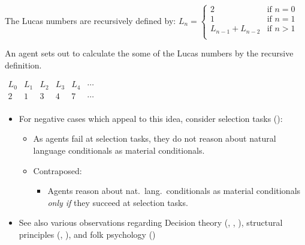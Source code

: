 \documentclass[10pt]{article}
\newcommand{\hand}{\ding{43}}
\begin{document}
\begin{note}
    \begin{scenario}%
    \label{scen:LucasNums}%
    The Lucas numbers are recursively defined by: \qquad
    \(
      L_{n} = \left\{
        \begin{array}{ll}
          2 & \text{if } n = 0 \\
          1 & \text{if } n = 1 \\
          L_{n-1} + L_{n-2} & \text{if } n > 1 \\
        \end{array}
      \right.
    \)

    \smallskip
    \noindent An agent sets out to calculate the some of the Lucas numbers by the recursive definition.
    \begin{center}
      \(
      \begin{array}{cccccc}
        L_{0} & L_{1} & L_{2} & L_{3} & L_{4} & \cdots \\
        \hline
        2 & 1 & 3 & 4 & 7 & \cdots \\
      \end{array}
      \)
    \end{center}
    \vspace{-2\baselineskip}
  \end{scenario}

\begin{comment}
  Note, the agent doesn't (necessarily) conclude \(L_{4}\) from \prop{0}-\val{0} pairs which detail \(L_{2}\) and \(L_{3}\).
  For, \(L_{2}\) and \(L_{3}\) both \fof{} the recursive definition.

  The agent's doesn't need anything other than the recursive definition to get \(L_{4}\), though they'll get \(L_{2}\) and \(L_{3}\) on the way to \(L_{4}\).
\end{comment}

  \begin{itemize}[noitemsep]
  \item[\hand]
    For negative cases which appeal to this idea, consider selection tasks (\cite{Wason:1966aa}):
    \begin{itemize}[noitemsep]
    \item[\leadsto]
      As agents fail at selection tasks, they do not reason about natural language conditionals as material conditionals.
    \item
      Contraposed:
      \begin{itemize}
      \item Agents reason about nat.\ lang.\ conditionals as material conditionals \emph{only if} they succeed at selection tasks.
      \end{itemize}
    \end{itemize}
  \item
    See also various observations regarding Decision theory (\cite{Allais:1979aa}, \cite{Ellsberg:1961aa}, \cite{Quinn:1990aa}), structural principles (\cite{Makinson:1965aa}, \cite{Kyburg:1997aa}), and folk psychology (\cite{Bratman:1981aa,Bratman:1987aa})
  \end{itemize}
\end{note}
\end{document}
